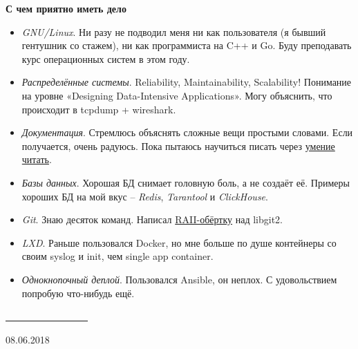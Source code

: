 \documentclass[final]{letter}
\begin{document}
{\bf С чем приятно иметь дело}
\begin{itemize}
\item \textit{GNU/Linux}. Ни разу не подводил меня ни как пользователя (я бывший гентушник со стажем), ни как программиста на C++ и Go. Буду преподавать курс операционных систем в этом году.
\item \textit{Распределённые системы}. Reliability, Maintainability, Scalability! Понимание на уровне «Designing Data-Intensive Applications». Могу объяснить, что происходит в tcpdump + wireshark.
\item \textit{Документация}. Стремлюсь объяснять сложные вещи простыми словами. Если получается, очень радуюсь. Пока пытаюсь научиться писать через \href{https://www.goodreads.com/review/list/43338630-sergey-machulskis?shelf=professional}{умение читать}.
\item \textit{Базы данных}. Хорошая БД снимает головную боль, а не создаёт её. Примеры хороших БД на мой вкус -- \textit{Redis}, \textit{Tarantool} и \textit{ClickHouse}.
\item \textit{Git}. Знаю десяток команд. Написал \href{https://github.com/neexee/review/tree/master/components/Git}{RAII-обёртку} над libgit2.
\item \textit{LXD}. Раньше пользовался Docker, но мне больше по душе контейнеры со своим syslog и init, чем single app container.
\item \textit{Однокнопочный деплой}. Пользовался Ansible, он неплох. С удовольствием попробую что-нибудь ещё.
\end{itemize}

\vfill
\begin{center}
\underline{~~~~~~~~~~~~~~~~~}

08.06.2018
\end{center}
\end{document}
